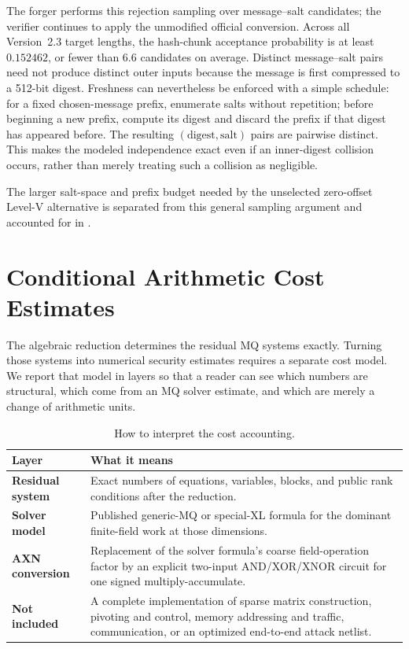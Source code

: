 \documentclass[11pt]{article}
\begin{document}
The forger performs this rejection sampling over message--salt candidates;
the verifier continues to apply the unmodified official conversion.  Across
all Version~2.3 target lengths, the hash-chunk acceptance probability is at
least $0.152462$, or fewer than 6.6 candidates on average.  Distinct
message--salt pairs need not produce distinct outer inputs because the message
is first compressed to a 512-bit digest.  Freshness can nevertheless be
enforced with a simple schedule: for a fixed chosen-message prefix, enumerate
salts without repetition; before beginning a new prefix, compute its digest
and discard the prefix if that digest has appeared before.  The resulting
$(\text{digest},\text{salt})$ pairs are pairwise distinct.  This makes the
modeled independence exact even if an inner-digest collision occurs, rather
than merely treating such a collision as negligible.

The larger salt-space and prefix budget needed by the unselected zero-offset
Level-V alternative is separated from this general sampling argument and
accounted for in .

\section{Conditional Arithmetic Cost Estimates}\label{sec:complexity}

The algebraic reduction determines the residual MQ systems exactly.  Turning
those systems into numerical security estimates requires a separate cost
model.  We report that model in layers so that a reader can see which numbers
are structural, which come from an MQ solver estimate, and which are merely a
change of arithmetic units.

\begin{table}[H]
\centering
\caption{How to interpret the cost accounting.}
\label{tab:cost-layers}
\small
\renewcommand{\arraystretch}{1.12}
\begin{tabularx}{0.96\textwidth}{@{}>{\bfseries}p{}X@{}}
\toprule
Layer & What it means\\
\midrule
Residual system & Exact numbers of equations, variables, blocks, and public
rank conditions after the reduction.\\
Solver model & Published generic-MQ or special-XL formula for the dominant
finite-field work at those dimensions.\\
AXN conversion & Replacement of the solver formula's coarse field-operation
factor by an explicit two-input AND/XOR/XNOR circuit for one signed
multiply-accumulate.\\
Not included & A complete implementation of sparse matrix construction,
pivoting and control, memory addressing and traffic, communication, or an
optimized end-to-end attack netlist.\\
\bottomrule
\end{tabularx}
\end{table}
\end{document}
